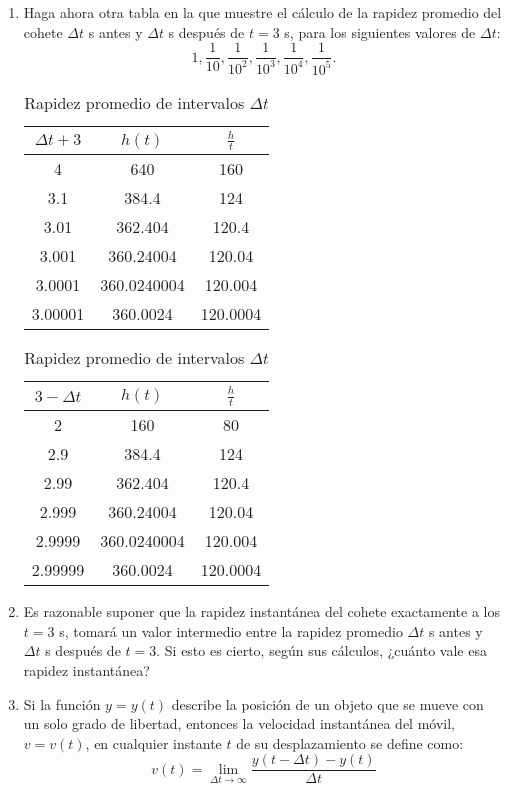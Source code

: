 \documentclass[12pt]{article}
\begin{document}
\begin{enumerate}
\item Haga ahora otra tabla en la que muestre el cálculo de la rapidez promedio del cohete $\Delta t$ s antes y $\Delta t$ s después de $t = 3$ s, para los siguientes valores de $\Delta t$:\[1,\frac{1}{10},\frac{1}{10^2},\frac{1}{10^3},\frac{1}{10^4},\frac{1}{10^5}.\]
\begin{table}[h]
\begin{center}
\begin{minipage}{0.45\linewidth}
\centering
\begin{tabular}{| c | c | c |}\hline
  $\Delta t+3$  & $h(t)$  &$\frac{h}{t}$\\ \hline
4&640&160 \\
3.1&384.4&124\\
3.01&362.404&120.4\\
3.001&360.24004&120.04\\
3.0001&360.0240004&120.004\\
3.00001&360.0024&120.0004 \\ \hline
\end{tabular}
\caption{Rapidez promedio de intervalos $\Delta t$}
\label{tab:rapprom+3}
\end{minipage}%
\hspace{0.05\linewidth} %
\begin{minipage}{0.45\linewidth}
  \centering
  \begin{tabular}{| c | c | c |}\hline
  $3 - \Delta t$  & $h(t)$  &$\frac{h}{t}$\\ \hline
2&160&80 \\
2.9&384.4&124\\
2.99&362.404&120.4\\
2.999&360.24004&120.04\\
2.9999&360.0240004&120.004\\
2.99999&360.0024&120.0004 \\ \hline
\end{tabular}
\caption{Rapidez promedio de intervalos $\Delta t$}
\label{tab:rapprom-3}
\end{minipage}
\end{center}
\end{table}


\item Es razonable suponer que la rapidez instantánea del cohete exactamente a los $t = 3$ s, tomará un valor intermedio entre la rapidez promedio $\Delta t$ s antes y $\Delta t$ s después de $t = 3$. Si esto es cierto, según sus cálculos, ¿cuánto vale esa rapidez instantánea?
\item Si la función $y = y(t)$ describe la posición de un objeto que se mueve con un solo grado de libertad, entonces la velocidad instantánea del móvil, $v = v(t)$, en cualquier instante $t$ de su desplazamiento se define como:
  \begin{equation}
    v(t) = \lim_{\Delta t \rightarrow \infty}\frac{y(t - \Delta t) - y(t)}{\Delta t}
  \end{equation}
  
\end{enumerate}
\end{document}
